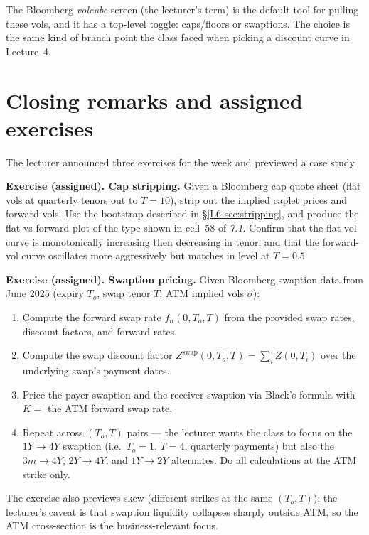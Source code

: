 The Bloomberg \emph{volcube} screen (the lecturer's term) is the
default tool for pulling these vols, and it has a top-level toggle:
caps/floors or swaptions. The choice is the same kind of branch point
the class faced when picking a discount curve in Lecture~4.

\section{Closing remarks and assigned exercises}\label{L6-sec:close}

The lecturer announced three exercises for the week and previewed a
case study.

\begin{exerciseblock}
\textbf{Exercise (assigned). Cap stripping.} Given a Bloomberg cap
quote sheet (flat vols at quarterly tenors out to $T = 10$), strip
out the implied caplet prices and forward vols. Use the bootstrap
described in \S\ref{L6-sec:stripping}, and produce the flat-vs-forward
plot of the type shown in cell~58 of \emph{7.1}. Confirm that the
flat-vol curve is monotonically increasing then decreasing in tenor,
and that the forward-vol curve oscillates more aggressively but
matches in level at $T = 0.5$.
\end{exerciseblock}

\begin{exerciseblock}
\textbf{Exercise (assigned). Swaption pricing.} Given Bloomberg
swaption data from June 2025 (expiry $T_o$, swap tenor $T$, ATM
implied vols $\sigma$):
\begin{enumerate}[label=(\arabic*)]
  \item Compute the forward swap rate $f_n(0, T_o, T)$ from the
        provided swap rates, discount factors, and forward rates.
  \item Compute the swap discount factor
        $Z^{\text{swap}}(0, T_o, T) = \sum_i Z(0, T_i)$ over the
        underlying swap's payment dates.
  \item Price the payer swaption and the receiver swaption via Black's
        formula with $K = $ the ATM forward swap rate.
  \item Repeat across $(T_o, T)$ pairs --- the lecturer wants the
        class to focus on the $1Y \to 4Y$ swaption (i.e.\ $T_o = 1$,
        $T = 4$, quarterly payments) but also the $3m \to 4Y$,
        $2Y \to 4Y$, and $1Y \to 2Y$ alternates. Do all calculations
        at the ATM strike only.
\end{enumerate}
The exercise also previews skew (different strikes at the same
$(T_o, T)$); the lecturer's caveat is that swaption liquidity
collapses sharply outside ATM, so the ATM cross-section is the
business-relevant focus.
\end{exerciseblock}

